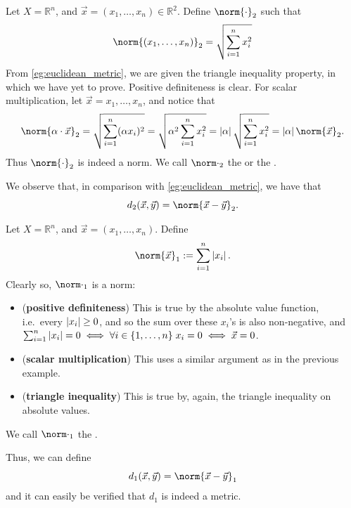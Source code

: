 \documentclass[notoc,notitlepage]{tufte-book}
\begin{document}
\begin{eg}\label{eg:euclidean_norm}
  Let $X = \mathbb{R}^n$, and $\vec{x} = ( x_1, \ldots, x_n ) \in \mathbb{R}^2$. Define $\norm{\cdot}_2$ such that
  \begin{equation*}
    \norm{(x_1, \ldots, x_n)}_2 = \sqrt{ \sum_{i=1}^{n} x_i^2 }
  \end{equation*}
  From \cref{eg:euclidean_metric}, we are given the triangle inequality property, in which we have yet to prove. Positive definiteness is clear. For scalar multiplication, let $\vec{x} = { x_1, \ldots, x_n }$, and notice that
  \begin{equation*}
    \norm{\alpha \cdot \vec{x}}_2 = \sqrt{ \sum_{i=1}^{n} (\alpha x_i)^2 } = \sqrt{ \alpha^2 \sum_{i=1}^{n} x_i^2 } = \abs{\alpha} \sqrt{ \sum_{i=1}^{n} x_i^2 } = \abs{\alpha} \norm{\vec{x}}_2.
  \end{equation*}
  Thus $\norm{\cdot}_2$ is indeed a norm. We call $\norm\cdot_2$ the  or the .

  We observe that, in comparison with \cref{eg:euclidean_metric}, we have that
  \begin{equation*}
    d_2(\vec{x}, \vec{y}) = \norm{\vec{x} - \vec{y}}_2.
  \end{equation*}
\end{eg}

\begin{eg}[1-norm]\label{eg:1_norm}
  Let $X = \mathbb{R}^n$, and $\vec{x} = ( x_1, \ldots, x_n )$. Define
  \begin{equation*}
    \norm{\vec{x}}_1 := \sum_{i = 1}^{n} \abs{x_i}.
  \end{equation*}
  Clearly so, $\norm\cdot_1$ is a norm:
  \begin{itemize}
    \item (\textbf{positive definiteness}) This is true by the absolute value function, i.e.\ every $\left|x_i\right| \geq 0$, and so the sum over these $x_i$'s is also non-negative, and $\sum_{i=1}^{n} \left|x_i\right| = 0 \iff \forall i \in \{ 1, \ldots, n\} \; x_i = 0 \iff \vec{x} = 0$.
    \item (\textbf{scalar multiplication}) This uses a similar argument as in the previous example.
    \item (\textbf{triangle inequality}) This is true by, again, the triangle inequality on absolute values.
  \end{itemize}
  We call $\norm\cdot_1$ the .

  Thus, we can define
  \begin{equation*}
    d_1(\vec{x}, \vec{y}) = \norm{\vec{x} - \vec{y}}_1
  \end{equation*}
  and it can easily be verified that $d_1$ is indeed a metric.
\end{eg}
\end{document}

